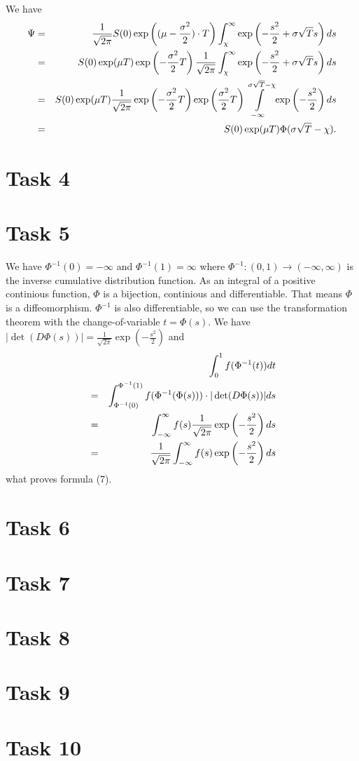 \documentclass[10pt,a4paper]{article}
\begin{document}
We have
\begin{eqnarray}
\Psi&=&\frac{1}{\sqrt{2\pi}}S(0)\exp\left((\mu-\frac{\sigma^2}{2})\cdot T\right)\int_{\chi}^{\infty}\exp\left(-\frac{s^2}{2}+\sigma\sqrt{T}s\right)ds \notag\\
&=&S(0)\exp(\mu T)\exp\left(-\frac{\sigma^2}{2}T\right)\frac{1}{\sqrt{2\pi}}\int_{\chi}^{\infty}\exp\left(-\frac{s^2}{2}+\sigma\sqrt{T}s\right)ds \notag\\
&=&S(0)\exp(\mu T)\frac{1}{\sqrt{2\pi}}\exp\left(-\frac{\sigma^2}{2}T\right)\exp\left(\frac{\sigma^2}{2}T\right)\int\limits_{-\infty}^{\sigma\sqrt{T}-\chi}\exp\left(-\frac{s^2}{2}\right)ds \notag\\
&=&S(0)\exp(\mu T)\Phi(\sigma\sqrt{T}-\chi). \notag
\end{eqnarray}

\section*{Task 4}

\section*{Task 5}
We have $\Phi^{-1}(0)=-\infty$ and $\Phi^{-1}(1)=\infty$ where $\Phi^{-1}:(0,1)\to(-\infty,\infty)$ is the inverse cumulative distribution function. As an integral of a positive continious function, $\Phi$ is a bijection, continious and differentiable. That means $\Phi$ is a diffeomorphism. $\Phi^{-1}$ is also differentiable, so we can use the transformation theorem with the change-of-variable $t=\Phi(s)$. We have $|\det(D\Phi(s))|=\frac{1}{\sqrt{2\pi}}\exp(-\frac{s^2}{2})$ and
\begin{eqnarray}
&&\int_0^1 f(\Phi^{-1}(t))dt \notag\\
&=&\int_{\Phi^{-1}(0)}^{\Phi^{-1}(1)}f(\Phi^{-1}(\Phi(s)))\cdot|\det(D\Phi(s))|ds \notag\\
&=&\int_{-\infty}^{\infty}f(s)\frac{1}{\sqrt{2\pi}}\exp\left(-\frac{s^2}{2}\right)ds \notag\\
&=&\frac{1}{\sqrt{2\pi}}\int_{-\infty}^{\infty}f(s)\exp\left(-\frac{s^2}{2}\right)ds \notag
\end{eqnarray}
what proves formula (7).

\section*{Task 6}

\section*{Task 7}

\section*{Task 8}

\section*{Task 9}

\section*{Task 10}
\end{document}
